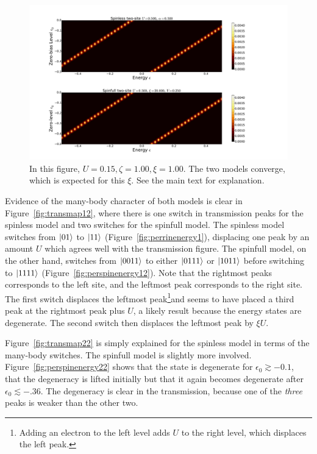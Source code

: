 \begin{figure}[!bt]
    \centering
    \includegraphics[height=.38\textheight]{pdf/map/transmap_u3_k4.pdf}
    \caption{In this figure, $U=0.15, \zeta=1.00, \xi=1.00$. The two models converge, which is expected for this $\xi$. See the main text for explanation.}
    \label{fig:transmap34}
\end{figure}

Evidence of the many-body character of both models is clear in Figure~\ref{fig:transmap12}, where there is one switch in transmission peaks for the spinless model and two switches for the spinfull model. The spinless model switches from $\ket{01}$ to $\ket{11}$ (Figure~\ref{fig:perrinenergy1}), displacing one peak by an amount $U$ which agrees well with the transmission figure.  The spinfull model, on the other hand, switches from $\ket{0011}$ to either $\ket{0111}$ or $\ket{1011}$ before switching to $\ket{1111}$ (Figure~\ref{fig:perspinenergy12}). Note that the rightmost peaks corresponds to the left site, and the leftmost peak corresponds to the right site. The first switch displaces the leftmost peak\footnote{Adding an electron to the left level adds $U$ to the right level, which displaces the left peak.}and seems to have placed a third peak at the rightmost peak plus $U$, a likely result because the energy states are degenerate. The second switch then displaces the leftmost peak by $\xi U$. 

Figure~\ref{fig:transmap22} is simply explained for the spinless model in terms of the many-body switches. The spinfull model is slightly more involved. Figure~\ref{fig:perspinenergy22} shows that the state is degenerate for $\epsilon_0 \gtrsim -0.1$, that the degeneracy is lifted initially but that it again becomes degenerate after $\epsilon_0 \lesssim -.36$. The degeneracy is clear in the transmission, because one of the \emph{three} peaks is weaker than the other two. 

